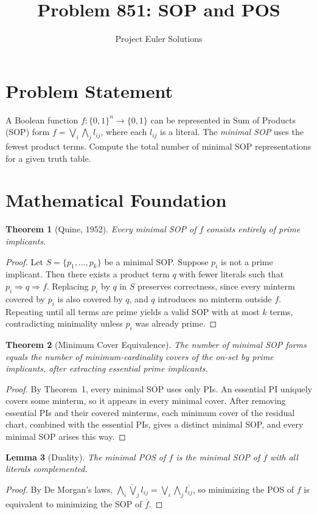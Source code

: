 \documentclass[11pt]{article}
\title{Problem 851: SOP and POS}
\author{Project Euler Solutions}
\date{}
\newtheorem{theorem}{Theorem}
\newtheorem{lemma}[theorem]{Lemma}
\begin{document}
\maketitle

\section{Problem Statement}
A Boolean function $f\colon \{0,1\}^n \to \{0,1\}$ can be represented in Sum of Products (SOP) form
$f = \bigvee_{i} \bigwedge_{j} l_{ij}$, where each $l_{ij}$ is a literal.
The \emph{minimal SOP} uses the fewest product terms.
Compute the total number of minimal SOP representations for a given truth table.

\section{Mathematical Foundation}

\begin{theorem}[Quine, 1952]
Every minimal SOP of $f$ consists entirely of prime implicants.
\end{theorem}
\begin{proof}
Let $S = \{p_1, \ldots, p_k\}$ be a minimal SOP. Suppose $p_i$ is not a prime implicant.
Then there exists a product term $q$ with fewer literals such that $p_i \Rightarrow q \Rightarrow f$.
Replacing $p_i$ by $q$ in $S$ preserves correctness, since every minterm covered by $p_i$
is also covered by $q$, and $q$ introduces no minterm outside $f$. Repeating until all terms
are prime yields a valid SOP with at most $k$ terms, contradicting minimality
unless $p_i$ was already prime.
\end{proof}

\begin{theorem}[Minimum Cover Equivalence]
The number of minimal SOP forms equals the number of minimum-cardinality covers
of the on-set by prime implicants, after extracting essential prime implicants.
\end{theorem}
\begin{proof}
By Theorem~1, every minimal SOP uses only PIs. An essential PI uniquely covers
some minterm, so it appears in every minimal cover. After removing essential PIs and
their covered minterms, each minimum cover of the residual chart, combined with
the essential PIs, gives a distinct minimal SOP, and every minimal SOP arises this way.
\end{proof}

\begin{lemma}[Duality]
The minimal POS of $f$ is the minimal SOP of $\overline{f}$ with all literals complemented.
\end{lemma}
\begin{proof}
By De Morgan's laws, $\overline{\bigwedge_i \bigvee_j l_{ij}} = \bigvee_i \bigwedge_j \overline{l_{ij}}$,
so minimizing the POS of $f$ is equivalent to minimizing the SOP of $\overline{f}$.
\end{proof}
\end{document}
